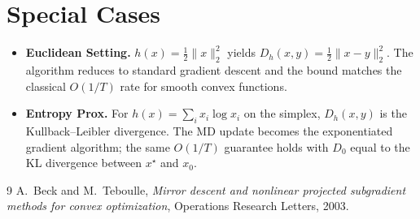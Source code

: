 \documentclass[11pt]{article}
\newcommand{\Breg}[2]{D_{h}(#1,#2)}
\begin{document}
\section*{Special Cases}
\begin{itemize}
\item \textbf{Euclidean Setting.} $h(x)=\tfrac12\|x\|_{2}^{2}$ yields $\Breg{x}{y}=\tfrac12\|x-y\|_{2}^{2}$. The algorithm reduces to standard gradient descent and the bound matches the classical $O(1/T)$ rate for smooth convex functions.
\item \textbf{Entropy Prox.} For $h(x)=\sum_{i}x_i\log x_i$ on the simplex, $\Breg{x}{y}$ is the Kullback–Leibler divergence. The MD update becomes the exponentiated gradient algorithm; the same $O(1/T)$ guarantee holds with $D_0$ equal to the KL divergence between $x^{\star}$ and $x_0$.
\end{itemize}

\begin{thebibliography}{9}
A.~Beck and M.~Teboulle, \emph{Mirror descent and nonlinear projected subgradient methods for convex optimization}, Operations Research Letters, 2003.
\end{thebibliography}
\end{document}
